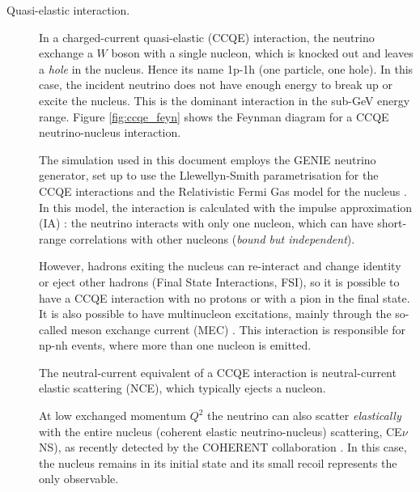 \begin{description}
\item[Quasi-elastic interaction.] In a charged-current quasi-elastic (CCQE) interaction, the neutrino exchange a $W$ boson with a single nucleon, which is knocked out and leaves a \emph{hole} in the nucleus. Hence its name 1p-1h (one particle, one hole). In this case, the incident neutrino does not have enough energy to break up or excite the nucleus. This is the dominant interaction in the sub-GeV energy range. Figure \ref{fig:ccqe_feyn} shows the Feynman diagram for a CCQE neutrino-nucleus interaction.

The simulation used in this document employs the GENIE neutrino generator, set up to use the Llewellyn-Smith parametrisation for the CCQE interactions \cite{LlewellynSmith:1971uhs} and the Relativistic Fermi Gas model for the nucleus \cite{Smith:1972xh}.
In this model, the interaction is calculated with the impulse approximation (IA) \cite{Benhar:2005dj}: the neutrino interacts with only one nucleon, which can have short-range correlations with other nucleons (\emph{bound but independent}).

However, hadrons exiting the nucleus can re-interact and change identity or eject other hadrons (Final State Interactions, FSI), so it is possible to have a CCQE interaction with no protons or with a pion in the final state. It is also possible to have multinucleon excitations, mainly through the so-called meson exchange current (MEC) \cite{Bodek:2011ps}. This interaction is responsible for np-nh events, where more than one nucleon is emitted.

The neutral-current equivalent of a CCQE interaction is neutral-current elastic scattering (NCE), which typically ejects a nucleon.

At low exchanged momentum $Q^2$ the neutrino can also scatter \emph{elastically} with the entire nucleus (coherent elastic neutrino-nucleus) scattering, CE$\nu$NS), as recently detected by the COHERENT collaboration \cite{Akimov:2017ade}. In this case, the nucleus remains in its initial state and its small recoil represents the only observable.


\end{description}

